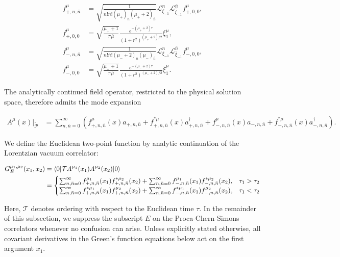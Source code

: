 \begin{align}
f_{+,n,\bar{n}}^{\mu} & =\sqrt{ \frac{1}{n!\bar{n}!(\mu _{+})_{n}(\mu _{+}+2)_{\bar{n}}} }\mathcal{L}_{\xi _{-1}}^{n}\mathcal{L}_{\bar{\xi}_{-1}}^{\bar{n}}f_{+,0,0}^{\mu}, \\
f_{+,0,0}^{\mu} & =\sqrt{ \frac{\mu _{+}+1}{\pi \bar{\mu}} } \frac{e^{-(\mu _{+}+2)\tau}}{(1+r^{2})^{(\mu _{+}+2)/2}}\xi _{1}^{\mu}, \\
f_{-,n,\bar{n}}^{\mu} & =\sqrt{ \frac{1}{n!\bar{n}!(\mu _{-}+2)_{n}(\mu _{-})_{\bar{n}}} }\mathcal{L}_{\xi _{-1}}^{n}\mathcal{L}_{\bar{\xi}_{-1}}^{\bar{n}}f_{-,0,0}^{\mu}, \\
f_{-,0,0}^{\mu} & =\sqrt{ \frac{\mu _{-}+1}{\pi \bar{\mu}} } \frac{e^{-(\mu _{-}+2)\tau}}{(1+r^{2})^{(\mu _{-}+2)/2}}\bar{\xi} _{1}^{\mu}.
\end{align}

The analytically continued field operator, restricted to the physical solution space, therefore admits the mode expansion

\begin{align}
A^{\mu}(x)|_{\widetilde{\mathcal{P}}} & =\sum ^{\infty}_{n,\bar{n}=0}\left(f^{\mu}_{+,n,\bar{n}}(x)a_{+,n,\bar{n}}+f_{+,n,\bar{n}}^{*\mu}(x)a^{\dagger}_{+,n,\bar{n}}+f^{\mu}_{-,n,\bar{n}}(x)a_{-,n,\bar{n}}+f_{-,n,\bar{n}}^{*\mu}(x)a^{\dagger}_{-,n,\bar{n}}\right).
\end{align}

We define the Euclidean two-point function by analytic continuation of the Lorentzian vacuum correlator:

\begin{align}
G_{E}^{\mu_{1},\mu_{2}}(x_{1},x_{2}) & =\left\langle 0|\mathcal{T}A^{\mu_{1}}(x_{1})A^{\mu_{2}}(x_{2})|0 \right\rangle \\
& =\begin{cases}
\sum ^{\infty}_{n,\bar{n}=0}f^{\mu_{1}}_{+,n,\bar{n}}(x_{1})f^{*\mu_{2}}_{+,n,\bar{n}}(x_{2})+\sum ^{\infty}_{n,\bar{n}=0}f^{\mu_{1}}_{-,n,\bar{n}}(x_{1})f^{*\mu_{2}}_{-,n,\bar{n}}(x_{2}), & \tau _{1}>\tau _{2} \\
\sum ^{\infty}_{n,\bar{n}=0}f^{*\mu_{1}}_{+,n,\bar{n}}(x_{1})f^{\mu_{2}}_{+,n,\bar{n}}(x_{2})+\sum ^{\infty}_{n,\bar{n}=0}f^{*\mu_{1}}_{-,n,\bar{n}}(x_{1})f^{\mu_{2}}_{-,n,\bar{n}}(x_{2}), & \tau _{1}<\tau _{2}
\end{cases}
\end{align}

Here, $\mathcal{T}$ denotes ordering with respect to the Euclidean time $\tau$. In the remainder of this subsection, we suppress the subscript $E$ on the Proca-Chern-Simons correlators whenever no confusion can arise. Unless explicitly stated otherwise, all covariant derivatives in the Green's function equations below act on the first argument $x_{1}$.

